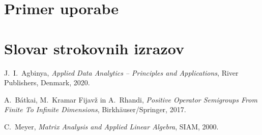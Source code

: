 \documentclass[mat1]{fmfdelo}
\begin{document}
\section{Primer uporabe}

\section*{Slovar strokovnih izrazov}

\geslo{}{}
\geslo{}{}

\begin{thebibliography}{99}

 J.~I.~Agbinya, \emph{Applied Data Analytics -- Principles and Applications}, River Publishers, Denmark, 2020.

 A.~B\'{a}tkai, M.~Kramar Fijavž in A.~Rhandi, \emph{Positive Operator Semigroups From Finite To Infinite Dimensions}, Birkh\"{a}user/Springer, 2017.

 C.~Meyer, \emph{Matrix Analysis and Applied Linear Algebra}, SIAM, 2000.


\end{thebibliography}
\end{document}
